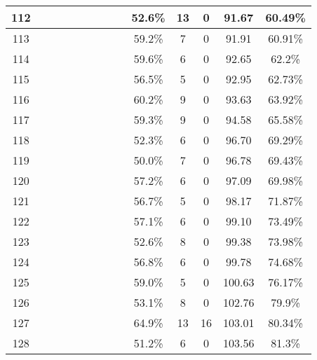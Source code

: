 \begin{longtable}{|c|c|c|c|c|c|c|c|c|c|c|c|c|c|}
112 &  \x    & \x    &       &       &       &       &       & \x\m  & 52.6\% &  13 & 0  & 91.67 & 60.49\% \\ \hline
113 &  \x    & \x    & \x    &       &       & \x\m  &       & \x\m  & 59.2\% &  7  & 0  & 91.91 & 60.91\% \\ \hline
114 &  \x    & \x    & \x    &       &       & \x\m  & \x\m  &       & 59.6\% &  6  & 0  & 92.65 & 62.2\% \\ \hline
115 &  \x    & \x    &       & \x    & \x    & \x    &       & \x    & 56.5\% &  5  & 0  & 92.95 & 62.73\% \\ \hline
116 &  \x    & \x    & \x    &       &       &       & \x\m  &       & 60.2\% &  9  & 0  & 93.63 & 63.92\% \\ \hline
117 &  \x    & \x    & \x    &       &       & \x\m  & \x    &       & 59.3\% &  9  & 0  & 94.58 & 65.58\% \\ \hline
118 &  \x    & \x    &       &       &       &       &       & \x    & 52.3\% &  6  & 0  & 96.70 & 69.29\% \\ \hline
119 &  \x    & \x    &       &       &       & \x\m  &       &       & 50.0\% &  7  & 0  & 96.78 & 69.43\% \\ \hline
120 &  \x    & \x    &       &       & \x    &       &       & \x    & 57.2\% &  6  & 0  & 97.09 & 69.98\% \\ \hline
121 &  \x    & \x    &       & \x    & \x    & \x    & \x    &       & 56.7\% &  5  & 0  & 98.17 & 71.87\% \\ \hline
122 &  \x    & \x    &       &       & \x    & \x    &       & \x    & 57.1\% &  6  & 0  & 99.10 & 73.49\% \\ \hline
123 &  \x    & \x    &       &       &       &       & \x    &       & 52.6\% &  8  & 0  & 99.38 & 73.98\% \\ \hline
124 &  \x    & \x    &       &       & \x    &       & \x    &       & 56.8\% &  6  & 0  & 99.78 & 74.68\% \\ \hline
125 &  \x    & \x    & \x    &       &       & \x\m  &       & \x    & 59.0\% &  5  & 0  & 100.63 & 76.17\% \\ \hline
126 &  \x    & \x    &       & \x    &       &       &       & \x\m  & 53.1\% &  8  & 0  & 102.76 & 79.9\% \\ \hline
127 &  \x    & \x    &       & \x    & \x\m  &       & \x\m  &       & 64.9\% &  13 & 16 & 103.01 & 80.34\% \\ \hline
128 &  \x    & \x    &       &       &       & \x    & \x    &       & 51.2\% &  6  & 0  & 103.56 & 81.3\% \\ \hline

\end{longtable}
